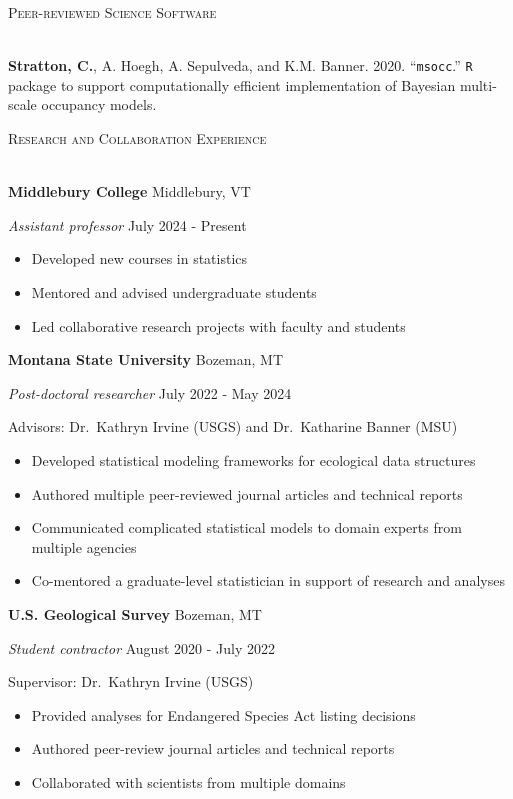 \documentclass[a4paper]{article}
\newcommand{\lineunder} {
	\vspace*{-8pt} \\
	\hspace*{-18pt} \hrulefill \\
}
\newcommand{\header} [1] {
	{\hspace*{-18pt}\vspace*{6pt} \textcolor{Cerulean}{\textsc{#1}}}
	\vspace*{-6pt} \textcolor{Cerulean}{\lineunder}
}
\begin{document}
\header{Peer-reviewed Science Software}
\vspace*{2mm}

\textbf{Stratton, C.}, A. Hoegh, A. Sepulveda, and K.M. Banner. 2020.
``\texttt{msocc}.'' \texttt{R} package to support computationally
efficient implementation of Bayesian multi-scale occupancy models.
\vspace*{2mm}

\header{Research and Collaboration Experience}
\vspace*{2mm}

\textbf{Middlebury College} \hfill Middlebury, VT

\textit{Assistant professor} \hfill July 2024 - Present

\vspace{-1mm}
\begin{itemize} \itemsep 1pt
    \item Developed new courses in statistics
    \item Mentored and advised undergraduate students
    \item Led collaborative research projects with faculty and students
\end{itemize}

\textbf{Montana State University} \hfill Bozeman, MT

\textit{Post-doctoral researcher} \hfill July 2022 - May 2024

Advisors: Dr.~Kathryn Irvine (USGS) and Dr.~Katharine Banner (MSU)

\vspace{-1mm}
\begin{itemize} \itemsep 1pt
    \item Developed statistical modeling frameworks for ecological data structures
    \item Authored multiple peer-reviewed journal articles and technical reports
    \item Communicated complicated statistical models to domain experts from multiple agencies
    \item Co-mentored a graduate-level statistician in support of research and analyses
\end{itemize}

\textbf{U.S. Geological Survey} \hfill Bozeman, MT

\textit{Student contractor} \hfill August 2020 - July 2022

Supervisor: Dr.~Kathryn Irvine (USGS)

\vspace{-1mm}
\begin{itemize} \itemsep 1pt
   \item Provided analyses for Endangered Species Act listing decisions
   \item Authored peer-review journal articles and technical reports
   \item Collaborated with scientists from multiple domains 
\end{itemize}
\end{document}
